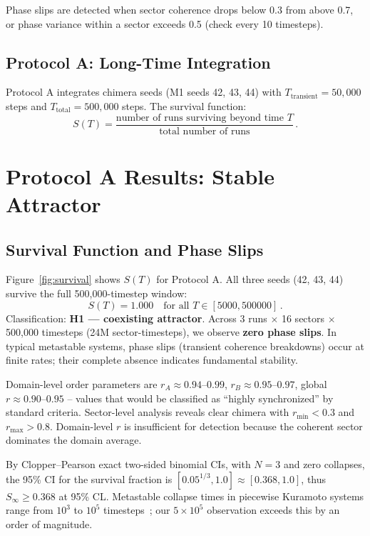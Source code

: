 \documentclass[12pt]{article}
\begin{document}
Phase slips are detected when sector coherence drops below 0.3 from above 0.7, or phase variance within a sector exceeds 0.5 (check every 10 timesteps).

\subsection{Protocol A: Long-Time Integration}

Protocol A integrates chimera seeds (M1 seeds 42, 43, 44) with $T_{\textrm{transient}} = 50,000$ steps and $T_{\textrm{total}} = 500,000$ steps. The survival function:
\begin{equation}
S(T) = \frac{\textrm{number of runs surviving beyond time }T}{\textrm{total number of runs}}\,.
\label{eq:survival}
\end{equation}

\section{Protocol A Results: Stable Attractor}\label{sec:results}

\subsection{Survival Function and Phase Slips}

Figure~\ref{fig:survival} shows $S(T)$ for Protocol A. All three seeds (42, 43, 44) survive the full 500,000-timestep window:
\begin{equation}
S(T) = 1.000 \quad \textrm{for all } T \in [5000, 500000]\,.
\end{equation}
Classification: \textbf{H1 --- coexisting attractor}. Across 3 runs $\times$ 16 sectors $\times$ 500,000 timesteps (24M sector-timesteps), we observe \textbf{zero phase slips}. In typical metastable systems, phase slips (transient coherence breakdowns) occur at finite rates; their complete absence indicates fundamental stability.

Domain-level order parameters are $r_A \approx 0.94$--$0.99$, $r_B \approx 0.95$--$0.97$, global $r \approx 0.90$--$0.95$ -- values that would be classified as ``highly synchronized'' by standard criteria. Sector-level analysis reveals clear chimera with $r_{\textrm{min}} < 0.3$ and $r_{\textrm{max}} > 0.8$. Domain-level $r$ is insufficient for detection because the coherent sector dominates the domain average.

By Clopper--Pearson exact two-sided binomial CIs, with $N=3$ and zero collapses, the 95\% CI for the survival fraction is $[0.05^{1/3}, 1.0] \approx [0.368, 1.0]$, thus $S_\infty \geq 0.368$ at 95\% CL. Metastable collapse times in piecewise Kuramoto systems range from $10^3$ to $10^5$ timesteps~\cite{floriach2024}; our $5\times 10^5$ observation exceeds this by an order of magnitude.
\end{document}
